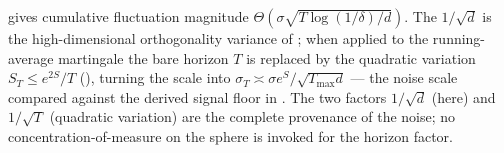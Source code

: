 \begin{remark}
\label{rem:azuma_scaling}
 gives cumulative fluctuation magnitude
$\Theta(\sigma\sqrt{T\log(1/\delta)/d})$. The $1/\sqrt d$ is the
high-dimensional orthogonality variance of ; when
applied to the running-average martingale the bare horizon $T$ is
replaced by the quadratic variation $S_T\le e^{2S}/T$
(), turning the scale into
$\sigma_T\asymp\sigma e^S/\sqrt{T_{\max}d}$ — the noise scale compared
against the derived signal floor in . The two factors
$1/\sqrt d$ (here) and $1/\sqrt T$ (quadratic variation) are the complete
provenance of the noise; no concentration-of-measure on the sphere is
invoked for the horizon factor.
\end{remark}
